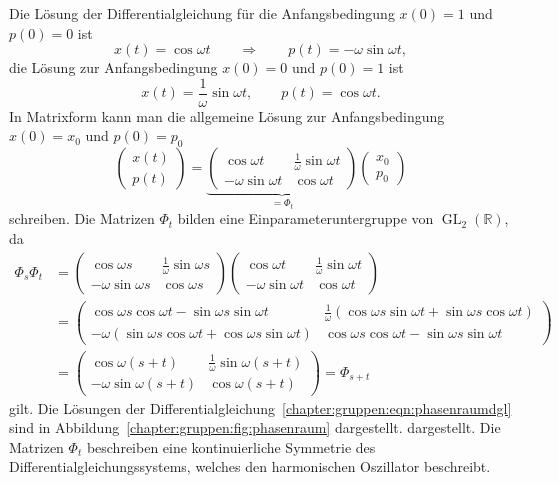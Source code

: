 Die Lösung der Differentialgleichung für die Anfangsbedingung $x(0)=1$ und
$p(0)=0$ ist
\[
x(t)
=
\cos \omega t
\qquad\Rightarrow\qquad
p(t)
=
-\omega \sin\omega t,
\]
die Lösung zur Anfangsbedingung $x(0)=0$ und $p(0)=1$ ist
\[
x(t) = \frac{1}{\omega} \sin\omega t,
\qquad
p(t) = \cos \omega t.
\]
In Matrixform kann man die allgemeine Lösung zur Anfangsbedingung $x(0)=x_0$
und $p(0)=p_0$
\begin{equation}
\begin{pmatrix}
x(t)\\
p(t)
\end{pmatrix}
=
\underbrace{
\begin{pmatrix}
 \cos \omega t & \frac{1}{\omega} \sin\omega t \\
-\omega \sin\omega t & \cos\omega t
\end{pmatrix}
}_{\displaystyle =\Phi_t}
\begin{pmatrix}x_0\\p_0\end{pmatrix}
\label{buch:gruppen:eqn:phi}
\end{equation}
schreiben.
Die Matrizen $\Phi_t$ bilden eine Einparameteruntergruppe von
$\operatorname{GL}_2(\mathbb{R})$, da
\begin{align*}
\Phi_s\Phi_t
&=
\begin{pmatrix}
 \cos\omega s & \frac{1}{\omega} \sin\omega s \\
-\omega \sin\omega s & \cos\omega s
\end{pmatrix}
\begin{pmatrix}
 \cos\omega t & \frac{1}{\omega} \sin\omega t \\
-\omega \sin\omega t & \cos\omega t
\end{pmatrix}
\\
&=
\begin{pmatrix}
\cos\omega s \cos\omega t - \sin\omega s \sin\omega t 
& \frac{1}{\omega} ( \cos\omega s \sin\omega t + \sin\omega s \cos \omega t)
\\
-\omega (\sin\omega s \cos\omega t + \cos\omega s \sin\omega t )
& \cos\omega s \cos\omega t -\sin\omega s \sin\omega t 
\end{pmatrix}
\\
&=
\begin{pmatrix}
 \cos\omega(s+t) & \frac{1}{\omega}\sin\omega(s+t) \\
-\omega \sin\omega(s+t) & \cos\omega(s+t)
\end{pmatrix}
=
\Phi_{s+t}
\end{align*}
gilt.
Die Lösungen der 
Differentialgleichung~\eqref{chapter:gruppen:eqn:phasenraumdgl}
sind in Abbildung~\ref{chapter:gruppen:fig:phasenraum} dargestellt.
dargestellt.
Die Matrizen $\Phi_t$ beschreiben eine kontinuierliche Symmetrie
des Differentialgleichungssystems, welches den harmonischen Oszillator
beschreibt.

